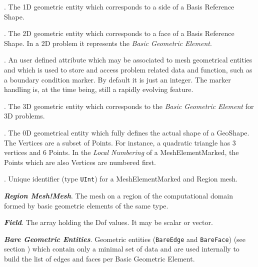 \begin{description}
\item \textbf{\emph{}}. The 1D geometric entity which
  corresponds to a side of a Basis Reference Shape.
  
\item \textbf{\emph{}}. The 2D geometric entity which
  corresponds to a face of a Basis Reference Shape. In a 2D problem it
  represents the \emph{Basic Geometric Element}.
  
\item \textbf{\emph{}}. An user defined attribute which may
  be associated to mesh geometrical entities and which is used to
  store and access problem related data and function, such as a
  boundary condition marker. By default it is just an integer.  The
  marker handling is, at the time being, still a rapidly evolving
  feature.

\item \textbf{\emph{}}. The 3D geometric entity
  which corresponds to the \emph{Basic Geometric Element} for 3D
  problems.
  
\item \textbf{\emph{}}. The 0D geometrical entity
  which fully defines the actual shape of a GeoShape. The Vertices are
  a subset of Points. For instance, a quadratic triangle has 3
  vertices and 6 Points. In the \emph{Local Numbering} of a
  MeshElementMarked, the Points which are also Vertices are numbered first.

\item \textbf{\emph{}}. Unique identifier (type \texttt{UInt})
for a MeshElementMarked and  Region mesh. 

\item\textbf{\emph{Region Mesh!Mesh}}. The mesh on a
  region of the computational domain formed by basic geometric
  elements of the same type.

\item \textbf{\emph{Field}}. The array holding the Dof
  values. It may be scalar or vector.
  
\item \textbf{\emph{Bare Geometric Entities}}. Geometric entities (\texttt{BareEdge} and
  \texttt{BareFace}) (see section ) which contain
  only a minimal set of data and are used internally to build the list
  of edges and faces per Basic Geometric Element.


\end{description}

